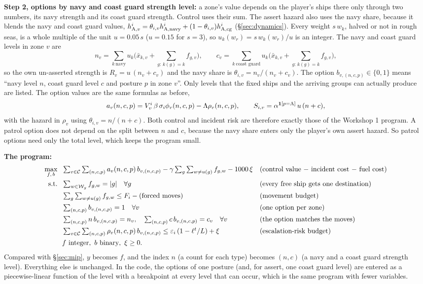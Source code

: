 \begin{addblock}
\textbf{Step 2, options by navy and coast guard strength level:} a zone's value depends on the player's ships there only
through two numbers, its navy strength and its coast guard strength. Control uses their sum. The assert hazard also
uses the navy share, because it blends the navy and coast guard values,
$h^i_{\mathrm{A},v}=\theta_{i,v}h^i_{\mathrm{A},\text{navy}}+(1-\theta_{i,v})h^i_{\mathrm{A},\text{cg}}$ (\S\ref{sec:dynamics}).
Every weight $s\,w_k$, halved or not in rough seas, is a whole multiple of the unit $u=0.05\,s$ ($u=0.15$ for $s=3$), so
$u_k(w_r)=s\,w_k(w_r)/u$ is an integer. The navy and coast guard levels in zone $v$ are
\[
n_v=\sum_{k\ \text{navy}}u_k\Big(\bar x_{k,v}+\sum_{g:\,k(g)=k}f_{g,v}\Big),\qquad
c_v=\sum_{k\ \text{coast guard}}u_k\Big(\bar x_{k,v}+\sum_{g:\,k(g)=k}f_{g,v}\Big),
\]
so the own un-asserted strength is $R_v=u\,(n_v+c_v)$ and the navy share is $\theta_{i,v}=n_v/(n_v+c_v)$. The option
$b_{v,(n,c,p)}\in\{0,1\}$ means ``navy level $n$, coast guard level $c$ and posture $p$ in zone $v$''. Only levels that the
fixed ships and the arriving groups can actually produce are listed. The option values are the same formulas as before,
\[
a_v(n,c,p)=V^i_v\,\beta\,\sigma_i\phi_v(n,c,p)-\Lambda\rho_v(n,c,p),\qquad S_{i,v}=\alpha^{\mathbf{1}[p=\mathrm{A}]}\,u\,(n+c),
\]
with the hazard in $\rho_v$ using $\theta_{i,v}=n/(n+c)$. Both control and incident risk are therefore exactly those of the
Workshop 1 program. A patrol option does not depend on the split between $n$ and $c$, because the navy share enters only the
player's own assert hazard. So patrol options need only the total level, which keeps the program small.

\textbf{The program:}
\begin{align*}
\max_{f,\,b}\ \ &\textstyle\sum_{v\in\C}\sum_{(n,c,p)}a_v(n,c,p)\,b_{v,(n,c,p)}
-\gamma\sum_{g}\sum_{w\ne u(g)}f_{g,w}-1000\,\xi
&&\text{(control value $-$ incident cost $-$ fuel cost)}\\
\text{s.t.}\ \ &\textstyle\sum_{w\in\mathcal W_g}f_{g,w}=|g|\quad\forall g
&&\text{(every free ship gets one destination)}\\
&\textstyle\sum_{g}\sum_{w\ne u(g)}f_{g,w}\le F_i-\text{(forced moves)}
&&\text{(movement budget)}\\
&\textstyle\sum_{(n,c,p)}b_{v,(n,c,p)}=1\quad\forall v
&&\text{(one option per zone)}\\
&\textstyle\sum_{(n,c,p)}n\,b_{v,(n,c,p)}=n_v,\quad \sum_{(n,c,p)}c\,b_{v,(n,c,p)}=c_v\quad\forall v
&&\text{(the option matches the moves)}\\
&\textstyle\sum_{v\in\C}\sum_{(n,c,p)}\rho_v(n,c,p)\,b_{v,(n,c,p)}\le\varepsilon_i\,(1-\ell^t/L)+\xi
&&\text{(escalation-risk budget)}\\
&f\ \text{integer},\ b\ \text{binary},\ \xi\ge0.
\end{align*}
Compared with \S\ref{sec:mip}, $y$ becomes $f$, and the index $n$ (a count for each type) becomes $(n,c)$ (a navy and a
coast guard strength level). Everything else is unchanged. In the code, the options of one posture (and, for assert, one coast guard
level) are entered as a piecewise-linear function of the level with a breakpoint at every level that can occur, which is
the same program with fewer variables.


\end{addblock}
